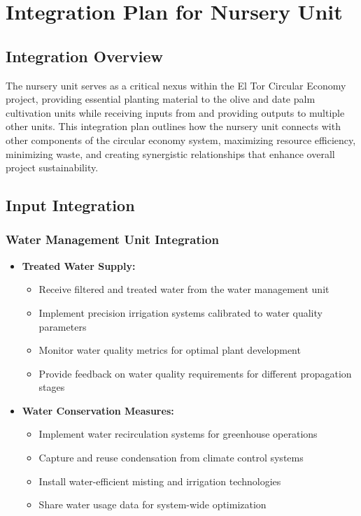 \section{Integration Plan for Nursery Unit}

\subsection{Integration Overview}
The nursery unit serves as a critical nexus within the El Tor Circular Economy project, providing essential planting material to the olive and date palm cultivation units while receiving inputs from and providing outputs to multiple other units. This integration plan outlines how the nursery unit connects with other components of the circular economy system, maximizing resource efficiency, minimizing waste, and creating synergistic relationships that enhance overall project sustainability.

\subsection{Input Integration}

\subsubsection{Water Management Unit Integration}
\begin{itemize}
    \item \textbf{Treated Water Supply:}
    \begin{itemize}
        \item Receive filtered and treated water from the water management unit
        \item Implement precision irrigation systems calibrated to water quality parameters
        \item Monitor water quality metrics for optimal plant development
        \item Provide feedback on water quality requirements for different propagation stages
    \end{itemize}
    
    \item \textbf{Water Conservation Measures:}
    \begin{itemize}
        \item Implement water recirculation systems for greenhouse operations
        \item Capture and reuse condensation from climate control systems
        \item Install water-efficient misting and irrigation technologies
        \item Share water usage data for system-wide optimization
    \end{itemize}
\end{itemize}

